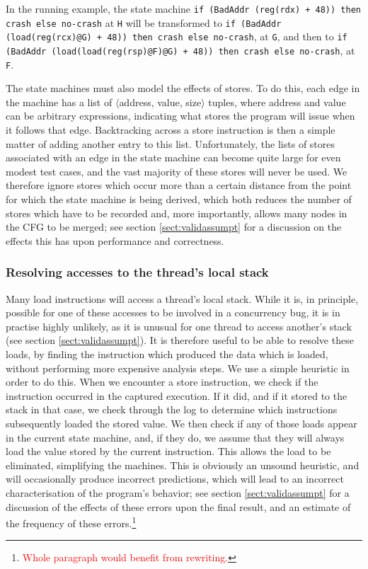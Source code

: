 \documentclass[10pt,twocolumn,preprint,natbib,authoryear]{sigplanconf}
\newcommand{\editorial}[1]{\textcolor{red}{\footnote{\textcolor{red}{#1}}}}
\begin{document}
In the running example, the state machine
\verb|if (BadAddr (reg(rdx) + 48)) then crash else no-crash| at
\verb|H| will be transformed to
\verb|if (BadAddr (load(reg(rcx)@G) + 48)) then crash else no-crash|,
at \verb|G|, and then to
\verb|if (BadAddr (load(load(reg(rsp)@F)@G) + 48)) then crash else no-crash|,
at \verb|F|.

The state machines must also model the effects of stores.  To do this,
each edge in the machine has a list of $\langle{}$address, value,
size$\rangle{}$ tuples, where address and value can be arbitrary
expressions, indicating what stores the program will issue when it
follows that edge.  Backtracking across a store instruction is then a
simple matter of adding another entry to this list.  Unfortunately,
the lists of stores associated with an edge in the state machine can
become quite large for even modest test cases, and the vast majority
of these stores will never be used.  We therefore ignore stores which
occur more than a certain distance from the point for which the state
machine is being derived, which both reduces the number of stores
which have to be recorded and, more importantly, allows many nodes in
the CFG to be merged; see section \ref{sect:validassumpt} for a
discussion on the effects this has upon performance and correctness.

\subsubsection{Resolving accesses to the thread's local stack}
\label{sect:resolvestack}

Many load instructions will access a thread's local stack.  While it
is, in principle, possible for one of these accesses to be involved in
a concurrency bug, it is in practise highly unlikely, as it is unusual
for one thread to access another's stack (see section
\ref{sect:validassumpt}).  It is therefore useful to be able to
resolve these loads, by finding the instruction which produced the
data which is loaded, without performing more expensive analysis
steps.  We use a simple heuristic in order to do this.  When we
encounter a store instruction, we check if the instruction occurred in
the captured execution.  If it did, and if it stored to the stack in
that case, we check through the log to determine which instructions
subsequently loaded the stored value.  We then check if any of those
loads appear in the current state machine, and, if they do, we assume
that they will always load the value stored by the current
instruction.  This allows the load to be eliminated, simplifying the
machines.  This is obviously an unsound heuristic, and will
occasionally produce incorrect predictions, which will lead to an
incorrect characterisation of the program's behavior; see section
\ref{sect:validassumpt} for a discussion of the effects of these
errors upon the final result, and an estimate of the frequency of
these errors.\editorial{Whole paragraph would benefit from rewriting.}
\end{document}
